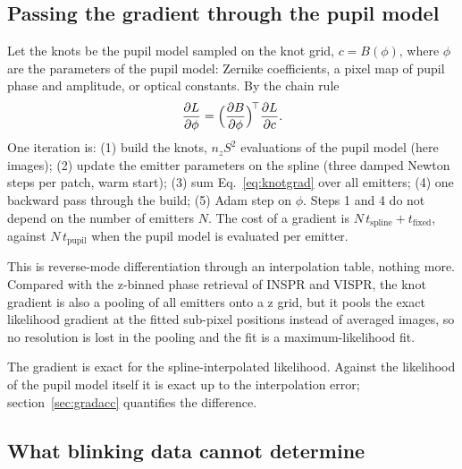 \documentclass[11pt,a4paper]{article}
\begin{document}
\subsection{Passing the gradient through the pupil model}
\label{sec:passthrough}

Let the knots be the pupil model sampled on the knot grid, $c=B(\phi)$, where $\phi$ are the parameters of the
pupil model: Zernike coefficients, a pixel map of pupil phase and amplitude, or optical constants. By the chain
rule
\begin{equation}
\frac{\partial L}{\partial\phi}=\Bigl(\frac{\partial B}{\partial\phi}\Bigr)^{\!\top}\frac{\partial L}{\partial c}.
\end{equation}
One iteration is: (1) build the knots, $n_zS^2$ evaluations of the pupil model (here \nknotimg{} images);
(2) update the emitter parameters on the spline (three damped Newton steps per patch, warm start);
(3) sum Eq.~\eqref{eq:knotgrad} over all emitters; (4) one backward pass through the build; (5) Adam step on
$\phi$. Steps 1 and 4 do not depend on the number of emitters $N$. The cost of a gradient is
$N\,t_\text{spline}+t_\text{fixed}$, against $N\,t_\text{pupil}$ when the pupil model is evaluated per emitter.

This is reverse-mode differentiation through an interpolation table, nothing more. Compared with the z-binned
phase retrieval of INSPR and VISPR, the knot gradient is also a pooling of all emitters onto a z grid, but it
pools the exact likelihood gradient at the fitted sub-pixel positions instead of averaged images, so no
resolution is lost in the pooling and the fit is a maximum-likelihood fit.

The gradient is exact for the spline-interpolated likelihood. Against the likelihood of the pupil model itself
it is exact up to the interpolation error; section~\ref{sec:gradacc} quantifies the difference.

\subsection{What blinking data cannot determine}
\label{sec:gauge}
\end{document}
